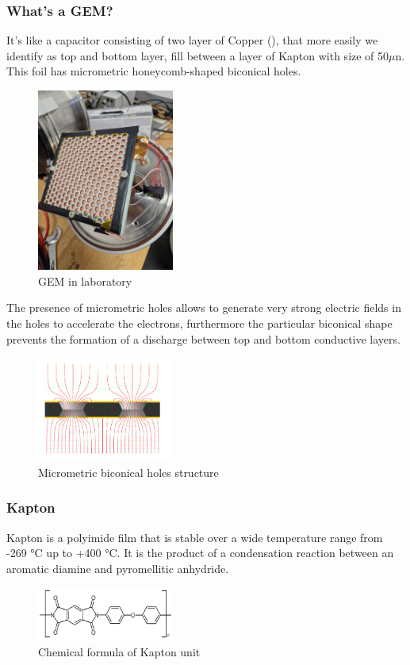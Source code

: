 \documentclass[a4paper,twoside,openany]{book}
\begin{document}
			\subsubsection{What's a GEM?}
It's like a capacitor consisting of two layer of Copper (), that more easily we identify as top and bottom layer, fill between a layer of Kapton with size of 50$\mu$n. This foil has micrometric honeycomb-shaped biconical holes.

\begin{figure}[H]
\centering
\includegraphics[width=0.4\textwidth, height=0.3\textwidth]{Griglia}
\caption{GEM in laboratory}
\end{figure}

The presence of micrometric holes allows to generate very strong electric fields in the holes to accelerate the electrons, furthermore the particular biconical shape prevents the formation of a discharge between top and bottom conductive layers.

\begin{figure}[H]
\centering
\includegraphics[width=0.4\textwidth, height=0.3\textwidth]{GEM6}
\caption{Micrometric biconical holes structure}
\end{figure}

			\subsubsection{Kapton}
Kapton is a polyimide film that is stable over a wide temperature range from -269 °C  up to +400 °C. It is the product of a condensation reaction between an aromatic diamine and pyromellitic anhydride.

\begin{figure}[H]
\centering
\includegraphics[width=0.4\textwidth, height=0.2\textwidth]{kapton}
\caption{Chemical formula of Kapton unit}
\end{figure}
\end{document}
